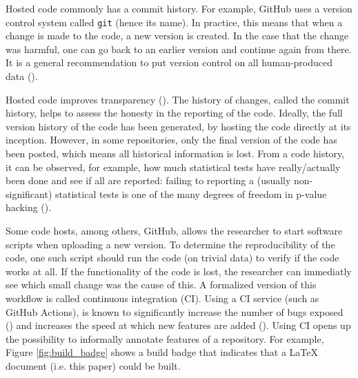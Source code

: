
Hosted code commonly has a commit history. For example, GitHub
uses a version control system called \verb|git| (hence its name).
In practice, this means that when a change is made to the code,
a new version is created. In the case that the change was harmful,
one can go back to an earlier version and continue again from there.
It is a general recommendation to put version control
on all human-produced data (\cite{wilson2014best}).


Hosted code improves transparency (\cite{gorgolewski2016practical}).
The history of changes, called the commit history, 
helps to assess the honesty in the reporting of the code. 
Ideally, the full version history of the code 
has been generated, by hosting the code directly at its inception.
However, in some repositories, only the final version of the code has been
posted, which means all historical information is lost.
From a code history, it can be observed, for example, 
how much statistical tests have really/actually been done 
and see if all are reported:
failing to reporting a (usually non-significant) statistical tests is 
one of the many degrees of freedom 
in p-value hacking (\cite{wicherts2016degrees}).


Some code hosts, among others, GitHub, 
allows the researcher to start software scripts when uploading a new version.
To determine the reproducibility of the code, one such script should
run the code (on trivial data) to verify if the code works at all.
If the functionality of the code is lost, the researcher
can immediatly see which small change was the cause of this.
A formalized version of this workflow is called continuous integration (CI).
Using a CI service (such as GitHub Actions), is known to significantly 
increase the number of bugs exposed (\cite{vasilescu2015}) and increases
the speed at which new features are added (\cite{vasilescu2015}).
Using CI opens up the possibility to informally annotate features of
a repository. For example, Figure \ref{fig:build_badge} shows a 
build badge that indicates that a LaTeX document (i.e. this paper)
could be built.

